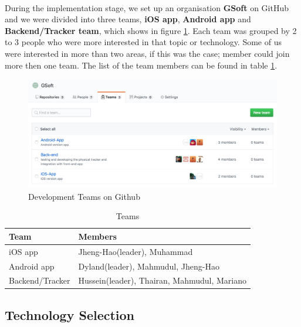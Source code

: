 \documentclass[12pt,a4paper]{article}
\begin{document}
        \paragraph{}During the implementation stage, we set up an organisation {\bf GSoft} on GitHub and we were divided into three teams, {\bf iOS app}, {\bf Android app} and {\bf Backend/Tracker team}, which shows in figure \ref{fig:Development Teams}. Each team was grouped by 2 to 3 people who were more interested in that topic or technology. Some of us were interested in more than two areas, if this was the case; member could join more then one team. The list of the team members can be found in table \ref{table:Teams}. 
        \begin{figure}[H]
          \centering
          \includegraphics[width=1\textwidth]{../assets/development-records-teams.png}
          \caption{Development Teams on Github}
          \label{fig:Development Teams}
        \end{figure}

        \begin{table}[H]
          \centering
            \begin{tabularx}{\textwidth}{l X}
              \hline
               Team & Members \\ \hline
               iOS app & Jheng-Hao(leader), Muhammad \\
               Android app & Dyland(leader), Mahmudul, Jheng-Hao \\ 
               Backend/Tracker  & Hussein(leader), Thairan, Mahmudul, Mariano \\
              \hline
            \end{tabularx}
            \caption[Table caption text]{Teams}
            \label{table:Teams}
        \end{table}        

      \subsection{Technology Selection} 
\end{document}
